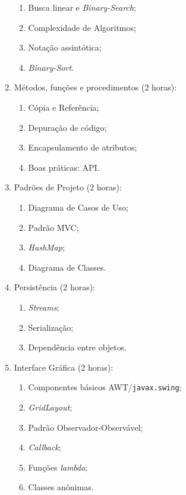 \documentclass{article}
\begin{document}
\begin{enumerate}
\begin{enumerate}
            \item Busca linear e \textit{Binary-Search};
            \item Complexidade de Algoritmos;
            \item Notação assintótica;
            \item \textit{Binary-Sort}.
        \end{enumerate}
    \item Métodos, funções e procedimentos (2 horas):
        \begin{enumerate}
            \item Cópia e Referência;
            \item Depuração de código;
            \item Encapsulamento de atributos;
            \item Boas práticas: API\@.
        \end{enumerate}
    \item Padrões de Projeto (2 horas):
        \begin{enumerate}
            \item Diagrama de Casos de Uso;
            \item Padrão MVC\@;
            \item \textit{HashMap};
            \item Diagrama de Classes.
        \end{enumerate}
    \item Persistência (2 horas):
        \begin{enumerate}
            \item \textit{Streams};
            \item Serialização;
            \item Dependência entre objetos.
        \end{enumerate}
    \item Interface Gráfica (2 horas):
        \begin{enumerate}
            \item Componentes básicos AWT/\texttt{javax.swing};
            \item \textit{GridLayout};
            \item Padrão Observador-Observável;
            \item \textit{Callback};
            \item Funções \textit{lambda};
            \item Classes anônimas.
        \end{enumerate}

\end{enumerate}
\end{document}
